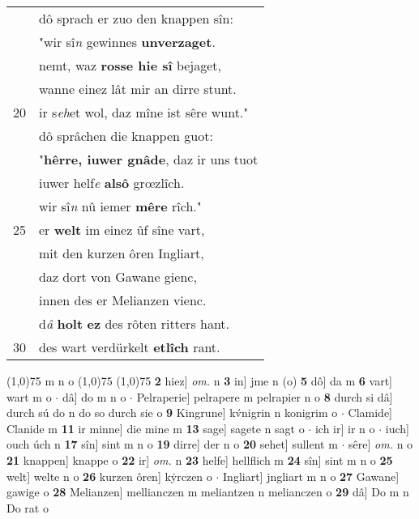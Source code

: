 \documentclass[8pt,a4paper,notitlepage]{article}
\begin{document}
\begin{table}[ht]
\begin{minipage}[t]{0.5\linewidth}
\begin{tabular}{rl}
 & dô sprach er zuo den knappen sîn:\\ 
 & "wir sî\textit{n} gewinnes \textbf{unverzaget}.\\ 
 & nemt, waz \textbf{rosse hie sî} bejaget,\\ 
 & wanne einez lât mir an dirre stunt.\\ 
20 & ir s\textit{eh}et wol, daz mîne ist sêre wunt."\\ 
 & dô sprâchen die knappen guot:\\ 
 & "\textbf{hêrre, iuwer gnâde}, daz ir uns tuot\\ 
 & iuwer helf\textit{e} \textbf{alsô} grœzlîch.\\ 
 & wir sî\textit{n} nû iemer \textbf{mêre} rîch."\\ 
25 & er \textbf{welt} im einez ûf sîne vart,\\ 
 & mit den kurzen ôren Ingliart,\\ 
 & daz dort von Gawane gienc,\\ 
 & innen des er Melianzen vienc.\\ 
 & d\textit{â} \textbf{holt} \textbf{ez} des rôten ritters hant.\\ 
30 & des wart verdürkelt \textbf{etlîch} rant.\\ 
\end{tabular}
\scriptsize
\line(1,0){75} \newline
m n o \newline
\line(1,0){75} \newline
\newline
\line(1,0){75} \newline
\textbf{2} hiez] \textit{om.} n \textbf{3} in] jme n (o) \textbf{5} dô] da m \textbf{6} vart] wart m o  $\cdot$ dâ] do m n o  $\cdot$ Pelraperie] pelrapere m pelrapier n o \textbf{8} durch si dâ] durch sú do n do so durch sie o \textbf{9} Kingrune] kv́nigrin n konigrim o  $\cdot$ Clamide] Clanide m \textbf{11} ir minne] die mine m \textbf{13} sage] sagete n sagt o  $\cdot$ ich ir] ir n o  $\cdot$ iuch] ouch úch n \textbf{17} sîn] sint m n o \textbf{19} dirre] der n o \textbf{20} sehet] sullent m  $\cdot$ sêre] \textit{om.} n o \textbf{21} knappen] knappe o \textbf{22} ir] \textit{om.} n \textbf{23} helfe] hellflich m \textbf{24} sîn] sint m n o \textbf{25} welt] welte n o \textbf{26} kurzen ôren] kẏrczen o  $\cdot$ Ingliart] jngliart m n o \textbf{27} Gawane] gawige o \textbf{28} Melianzen] mellianczen m meliantzen n melianczen o \textbf{29} dâ] Do m n Do rat o \newline
\end{minipage}
\end{table}
\end{document}
